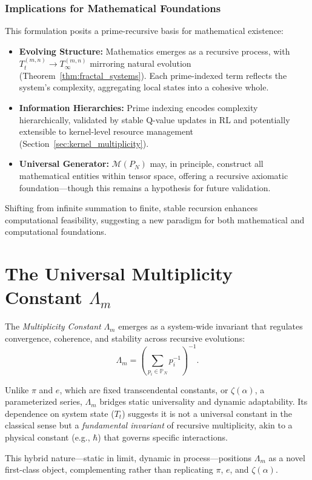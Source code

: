 \documentclass[12pt]{article}
\begin{document}
\subsubsection{Implications for Mathematical Foundations}
This formulation posits a prime-recursive basis for mathematical existence:
\begin{itemize}
    \item \textbf{Evolving Structure:} Mathematics emerges as a recursive process, with \(T_t^{(m,n)} \to T_\infty^{(m,n)}\) mirroring natural evolution (Theorem~\ref{thm:fractal_systems}). Each prime-indexed term reflects the system’s complexity, aggregating local states into a cohesive whole.
    \item \textbf{Information Hierarchies:} Prime indexing encodes complexity hierarchically, validated by stable Q-value updates in RL and potentially extensible to kernel-level resource management (Section~\ref{sec:kernel_multiplicity}).
    \item \textbf{Universal Generator:} \(\mathcal{M}(P_N)\) may, in principle, construct all mathematical entities within tensor space, offering a recursive axiomatic foundation—though this remains a hypothesis for future validation.
\end{itemize}
Shifting from infinite summation to finite, stable recursion enhances computational feasibility, suggesting a new paradigm for both mathematical and computational foundations.

\section{The Universal Multiplicity Constant \( \Lambda_m \)}
The \emph{Multiplicity Constant} \( \Lambda_m \) emerges as a system-wide invariant that regulates convergence, coherence, and stability across recursive evolutions:
\begin{equation}
\Lambda_m = \left( \sum_{p_i \in \mathbb{P}_N} p_i^{-1} \right)^{-1}.
\end{equation}

Unlike \(\pi\) and \(e\), which are fixed transcendental constants, or \(\zeta(\alpha)\), a parameterized series, \(\Lambda_m\) bridges static universality and dynamic adaptability. Its dependence on system state (\(T_t\)) suggests it is not a universal constant in the classical sense but a \textit{fundamental invariant} of recursive multiplicity, akin to a physical constant (e.g., \(\hbar\)) that governs specific interactions.

This hybrid nature—static in limit, dynamic in process—positions \(\Lambda_m\) as a novel first-class object, complementing rather than replicating \(\pi\), \(e\), and \(\zeta(\alpha)\).
\end{document}
